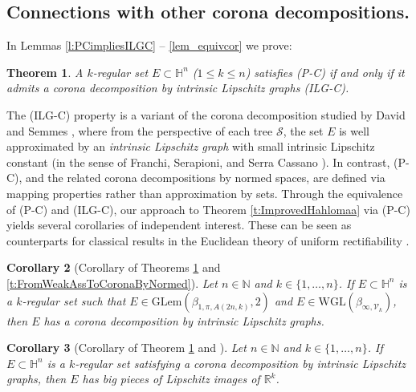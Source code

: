 \documentclass[12pt]{amsart}
\newcommand{\R}{\mathbb R}
\numberwithin{equation}{section}
\theoremstyle{plain}
\newtheorem{theorem}{Theorem}[section]
\newtheorem{corollary}[theorem]{Corollary}
\theoremstyle{definition}
\theoremstyle{remark}
\begin{document}
\subsection*{Connections with other corona decompositions.}
In Lemmas \ref{l:PCimpliesILGC}  -- \ref{lem_equivcor} we prove:
\begin{theorem}\label{t:CorEquiv}
A $k$-regular set $E\subset \mathbb{H}^n$ ($1\leq k\leq n$) satisfies (P-C) if and only if it admits a \emph{corona decomposition by intrinsic Lipschitz graphs (ILG-C)}.
\end{theorem}
The (ILG-C) property is a variant of the corona decomposition studied by David and Semmes \cite{David1}, where from the perspective of each tree $\mathcal{S}$, the set $E$ is well approximated by an \emph{intrinsic Lipschitz graph} with small intrinsic Lipschitz constant (in the sense of Franchi, Serapioni, and Serra Cassano \cite{MR3587666}). In contrast, (P-C), and the related corona decompositions by normed spaces, are defined via mapping properties rather than approximation by sets. Through the equivalence of (P-C) and (ILG-C), our approach to Theorem \ref{t:ImprovedHahlomaa} via (P-C) 
 yields several corollaries of independent interest. These can be seen as counterparts for classical results in the Euclidean theory of uniform rectifiability \cite{David1}.


\begin{corollary}
[Corollary of Theorems \ref{t:CorEquiv} and \ref{t:FromWeakAssToCoronaByNormed}]     \label{t:FromWeakAssToILG-C} 
    Let $n\in \mathbb{N}$ and $k\in \{1,\ldots,n\}$. If $E\subset \mathbb{H}^n$ is a $k$-regular set such that $E\in \mathrm{GLem}(\beta_{1,\pi,A(2n,k)},2)$ and $E\in \mathrm{WGL}(\beta_{\infty,\mathcal{V}_k})$, then $E$ has a corona decomposition by intrinsic Lipschitz graphs.
\end{corollary}

\begin{corollary}[Corollary of Theorem \ref{t:CorEquiv} and \cite{Bate}]\label{t:FromCoronaToBPLI}
    Let $n\in \mathbb{N}$ and $k\in \{1,\ldots,n\}$. If $E\subset \mathbb{H}^n$ is a $k$-regular set satisfying a corona decomposition by intrinsic Lipschitz graphs, then $E$ has big pieces of Lipschitz images of $\R^k$.
\end{corollary}
\end{document}
